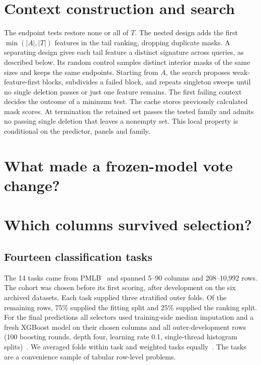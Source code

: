 \section{Context construction and search}
\label{sec:historical-design}

The endpoint tests restore none or all of $T$. The nested design adds the first $\min(|A|,|T|)$ features in the tail ranking, dropping duplicate masks. A separating design gives each tail feature a distinct signature across queries, as described below. Its random control samples distinct interior masks of the same sizes and keeps the same endpoints. Starting from $A$, the search proposes weak-feature-first blocks, subdivides a failed block, and repeats singleton sweeps until no single deletion passes or just one feature remains. The first failing context decides the outcome of a minimum test. The cache stores previously calculated mask scores. At termination the retained set passes the tested family and admits no passing single deletion that leaves a nonempty set. This local property is conditional on the predictor, panels and family.




\section{What made a frozen-model vote change?}





\section{Which columns survived selection?}
\subsection{Fourteen classification tasks}
The 14 tasks came from PMLB~\cite{romano2022pmlb} and spanned 5--90 columns and 208--10,992 rows. The cohort was chosen before its first scoring, after development on the six archived datasets. Each task supplied three stratified outer folds. Of the remaining rows, 75\% supplied the fitting split and 25\% supplied the ranking split. For the final predictions all selectors used training-side median imputation and a fresh XGBoost model on their chosen columns and all outer-development rows (100 boosting rounds, depth four, learning rate 0.1, single-thread histogram splits)~\cite{chen2016xgboost}. We averaged folds within task and weighted tasks equally~\cite{demsar2006comparisons}. The tasks are a convenience sample of tabular row-level problems.

